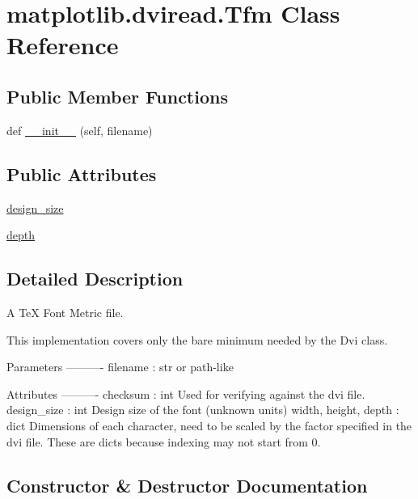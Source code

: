 \hypertarget{classmatplotlib_1_1dviread_1_1Tfm}{}\section{matplotlib.\+dviread.\+Tfm Class Reference}
\label{classmatplotlib_1_1dviread_1_1Tfm}
\subsection*{Public Member Functions}
\begin{DoxyCompactItemize}
\item 
def \hyperlink{classmatplotlib_1_1dviread_1_1Tfm_aca081d108c603b08e9c226e28157721b}{\+\_\+\+\_\+init\+\_\+\+\_\+} (self, filename)
\end{DoxyCompactItemize}
\subsection*{Public Attributes}
\begin{DoxyCompactItemize}
\item 
\hyperlink{classmatplotlib_1_1dviread_1_1Tfm_a283e26b9669ee08c83c0bf512d92f751}{design\+\_\+size}
\item 
\hyperlink{classmatplotlib_1_1dviread_1_1Tfm_a27ea271b7e2e098a9fc29fe79c09e3aa}{depth}
\end{DoxyCompactItemize}


\subsection{Detailed Description}
\begin{DoxyVerb}A TeX Font Metric file.

This implementation covers only the bare minimum needed by the Dvi class.

Parameters
----------
filename : str or path-like

Attributes
----------
checksum : int
   Used for verifying against the dvi file.
design_size : int
   Design size of the font (unknown units)
width, height, depth : dict
   Dimensions of each character, need to be scaled by the factor
   specified in the dvi file. These are dicts because indexing may
   not start from 0.
\end{DoxyVerb}
 

\subsection{Constructor \& Destructor Documentation}
\mbox{\label{classmatplotlib_1_1dviread_1_1Tfm_aca081d108c603b08e9c226e28157721b}} 
